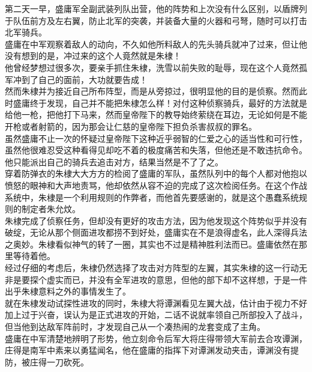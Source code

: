 \begin{multicols}{\theparacolNo}
第二天一早，盛庸军全副武装列队出营，他的阵势和上次没有什么区别，以盾牌列于队伍前方及左右翼，防止北军的突袭，并装备大量的火器和弓弩，随时可以打击北军骑兵。\\

盛庸在中军观察着敌人的动向，不久如他所料敌人的先头骑兵就冲了过来，但让他没有想到的是，冲过来的这个人竟然就是朱棣！\\

他曾经梦想过很多次，要亲手抓住朱棣，洗雪以前失败的耻辱，现在这个人竟然孤军冲到了自己的面前，大功就要告成！\\

然而朱棣并为接近自己所布阵型，而是从旁掠过，很明显他的目的是侦察。然而此时盛庸终于发现，自己并不能把朱棣怎么样！对付这种侦察骑兵，最好的方法就是给他一枪，把他打下马来，然而皇帝陛下的教导始终萦绕在耳边，无论如何是不能开枪或者射箭的，因为那会让仁慈的皇帝陛下担负杀害叔叔的罪名。\\

虽然盛庸不止一次的怀疑过皇帝陛下这种近乎弱智的仁爱之心的适当性和可行性，虽然他很难忍受这种看得见却吃不着的极度痛苦和失落，但他还是不敢违抗命令。他只能派出自己的骑兵去追击对方，结果当然是不了了之。\\

穿着防弹衣的朱棣大大方方的检阅了盛庸的军队，虽然队列中的每个人都对他抱以愤怒的眼神和大声地责骂，他却依然从容不迫的完成了这次检阅任务。在这个作战系统中，朱棣是一个利用规则的作弊者，而他首先要感谢的，就是这个愚蠢系统规则的制定者朱允炆。\\

朱棣完成了侦察任务，但却没有更好的攻击方法，因为他发现这个阵势似乎并没有破绽，无论从那个侧面进攻都捞不到好处，盛庸实在不是浪得虚名，此人深得兵法之奥妙。朱棣看似神气的转了一圈，其实也不过是精神胜利法而已。盛庸依然在那里等待着他。\\

经过仔细的考虑后，朱棣仍然选择了攻击对方阵型的左翼，其实朱棣的这一行动无非是要探个虚实而已，并没有全军进攻的意思，但他的部下却不这样想，于是一件出乎朱棣意料之外的事情发生了。\\

就在朱棣发动试探性进攻的同时，朱棣大将谭渊看见左翼大战，估计由于视力不好加上过于兴奋，误认为是正式进攻的开始，二话不说就率领自己所部投入了战斗，但当他到达敌军阵前时，才发现自己从一个凑热闹的龙套变成了主角。\\

盛庸在中军清楚地辨明了形势，他立刻命令后军大将庄得带领大军前去合攻谭渊，庄得是南军中素来以勇猛闻名，他在盛庸的指挥下对谭渊发动夹击，谭渊没有提防，被庄得一刀砍死。\\


\end{multicols}
